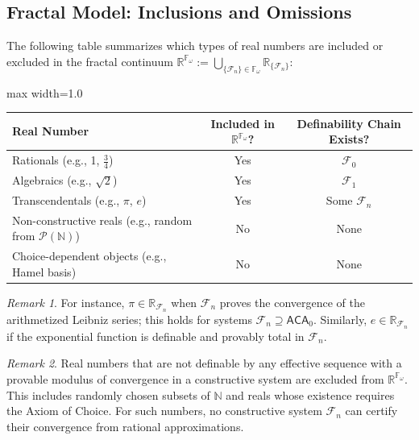 \documentclass[12pt]{article}
\theoremstyle{definition}
\theoremstyle{plain}
\theoremstyle{remark}
\newtheorem*{remark}{Remark}
\begin{document}
\subsection*{Fractal Model: Inclusions and Omissions}

The following table summarizes which types of real numbers are included or excluded in the fractal continuum \( \mathbb{R}^{\mathbb{F}_\omega} := \bigcup_{\{\mathcal{F}_n\} \in \mathbb{F}_\omega} \mathbb{R}_{\{\mathcal{F}_n\}} \):

\begin{center}
\begin{adjustbox}{max width=1.0\textwidth}
\begin{tabular}{@{} lcc @{} }
\toprule
\textbf{Real Number} & \textbf{Included in } \( \mathbb{R}^{\mathbb{F}_\omega} \)? & \textbf{Definability Chain Exists?} \\
\midrule
Rationals (e.g., 1, $\tfrac{3}{4}$) & Yes & $\mathcal{F}_0$ \\
Algebraics (e.g., $\sqrt{2}$) & Yes & $\mathcal{F}_1$ \\
Transcendentals (e.g., $\pi$, $e$) & Yes & Some $\mathcal{F}_n$ \\
Non-constructive reals (e.g., random from $\mathcal{P}(\mathbb{N})$) & No & None \\
Choice-dependent objects (e.g., Hamel basis) & No & None \\
\bottomrule
\end{tabular}
\end{adjustbox}
\end{center}

\begin{remark}
For instance, \( \pi \in \mathbb{R}_{\mathcal{F}_n} \) when \( \mathcal{F}_n \) proves the convergence of the arithmetized Leibniz series; this holds for systems \( \mathcal{F}_n \supseteq \mathsf{ACA}_0 \). Similarly, \( e \in \mathbb{R}_{\mathcal{F}_n} \) if the exponential function is definable and provably total in \( \mathcal{F}_n \).
\end{remark}

\begin{remark}
Real numbers that are not definable by any effective sequence with a provable modulus of convergence in a constructive system are excluded from \( \mathbb{R}^{\mathbb{F}_\omega} \). This includes randomly chosen subsets of \( \mathbb{N} \) and reals whose existence requires the Axiom of Choice. For such numbers, no constructive system \( \mathcal{F}_n \) can certify their convergence from rational approximations.
\end{remark}
\end{document}
